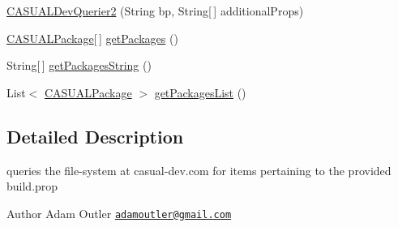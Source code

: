 \begin{DoxyCompactItemize}
\hyperlink{class_c_a_s_u_a_l_1_1network_1_1_c_a_s_u_a_l_dev_integration_1_1_c_a_s_u_a_l_dev_querier2_ad7a671dc1295f21cb2d725157c5dcd29}{C\-A\-S\-U\-A\-L\-Dev\-Querier2} (String bp, String\mbox{[}$\,$\mbox{]} additional\-Props)
\item 
\hyperlink{class_c_a_s_u_a_l_1_1network_1_1_c_a_s_u_a_l_dev_integration_1_1_c_a_s_u_a_l_package}{C\-A\-S\-U\-A\-L\-Package}\mbox{[}$\,$\mbox{]} \hyperlink{class_c_a_s_u_a_l_1_1network_1_1_c_a_s_u_a_l_dev_integration_1_1_c_a_s_u_a_l_dev_querier2_a3de0c87c69050c0eb316a82b6f871a1b}{get\-Packages} ()
\item 
String\mbox{[}$\,$\mbox{]} \hyperlink{class_c_a_s_u_a_l_1_1network_1_1_c_a_s_u_a_l_dev_integration_1_1_c_a_s_u_a_l_dev_querier2_a30068534c51ade3564df1200c2964d1f}{get\-Packages\-String} ()
\item 
List$<$ \hyperlink{class_c_a_s_u_a_l_1_1network_1_1_c_a_s_u_a_l_dev_integration_1_1_c_a_s_u_a_l_package}{C\-A\-S\-U\-A\-L\-Package} $>$ \hyperlink{class_c_a_s_u_a_l_1_1network_1_1_c_a_s_u_a_l_dev_integration_1_1_c_a_s_u_a_l_dev_querier2_a1206d3c0aba096946cabaeea185c999d}{get\-Packages\-List} ()
\end{DoxyCompactItemize}


\subsection{Detailed Description}
queries the file-\/system at casual-\/dev.\-com for items pertaining to the provided build.\-prop

\begin{DoxyAuthor}{Author}
Adam Outler \href{mailto:adamoutler@gmail.com}{\tt adamoutler@gmail.\-com} 
\end{DoxyAuthor}


